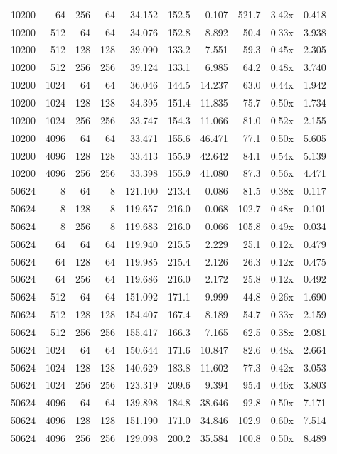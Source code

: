 {\begin{longtable}{rrrrrrrrrr}
10200 & 64 & 256 & 64 & 34.152 & 152.5 & 0.107 & 521.7 & 3.42x & 0.418\\
10200 & 512 & 64 & 64 & 34.076 & 152.8 & 8.892 & 50.4 & 0.33x & 3.938\\
10200 & 512 & 128 & 128 & 39.090 & 133.2 & 7.551 & 59.3 & 0.45x & 2.305\\
10200 & 512 & 256 & 256 & 39.124 & 133.1 & 6.985 & 64.2 & 0.48x & 3.740\\
10200 & 1024 & 64 & 64 & 36.046 & 144.5 & 14.237 & 63.0 & 0.44x & 1.942\\
10200 & 1024 & 128 & 128 & 34.395 & 151.4 & 11.835 & 75.7 & 0.50x & 1.734\\
10200 & 1024 & 256 & 256 & 33.747 & 154.3 & 11.066 & 81.0 & 0.52x & 2.155\\
10200 & 4096 & 64 & 64 & 33.471 & 155.6 & 46.471 & 77.1 & 0.50x & 5.605\\
10200 & 4096 & 128 & 128 & 33.413 & 155.9 & 42.642 & 84.1 & 0.54x & 5.139\\
10200 & 4096 & 256 & 256 & 33.398 & 155.9 & 41.080 & 87.3 & 0.56x & 4.471\\
50624 & 8 & 64 & 8 & 121.100 & 213.4 & 0.086 & 81.5 & 0.38x & 0.117\\
50624 & 8 & 128 & 8 & 119.657 & 216.0 & 0.068 & 102.7 & 0.48x & 0.101\\
50624 & 8 & 256 & 8 & 119.683 & 216.0 & 0.066 & 105.8 & 0.49x & 0.034\\
50624 & 64 & 64 & 64 & 119.940 & 215.5 & 2.229 & 25.1 & 0.12x & 0.479\\
50624 & 64 & 128 & 64 & 119.985 & 215.4 & 2.126 & 26.3 & 0.12x & 0.475\\
50624 & 64 & 256 & 64 & 119.686 & 216.0 & 2.172 & 25.8 & 0.12x & 0.492\\
50624 & 512 & 64 & 64 & 151.092 & 171.1 & 9.999 & 44.8 & 0.26x & 1.690\\
50624 & 512 & 128 & 128 & 154.407 & 167.4 & 8.189 & 54.7 & 0.33x & 2.159\\
50624 & 512 & 256 & 256 & 155.417 & 166.3 & 7.165 & 62.5 & 0.38x & 2.081\\
50624 & 1024 & 64 & 64 & 150.644 & 171.6 & 10.847 & 82.6 & 0.48x & 2.664\\
50624 & 1024 & 128 & 128 & 140.629 & 183.8 & 11.602 & 77.3 & 0.42x & 3.053\\
50624 & 1024 & 256 & 256 & 123.319 & 209.6 & 9.394 & 95.4 & 0.46x & 3.803\\
50624 & 4096 & 64 & 64 & 139.898 & 184.8 & 38.646 & 92.8 & 0.50x & 7.171\\
50624 & 4096 & 128 & 128 & 151.190 & 171.0 & 34.846 & 102.9 & 0.60x & 7.514\\
50624 & 4096 & 256 & 256 & 129.098 & 200.2 & 35.584 & 100.8 & 0.50x & 8.489\\
\end{longtable}
}

